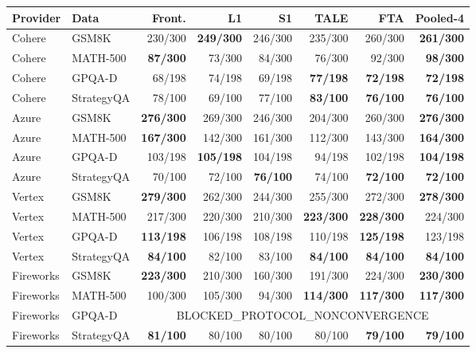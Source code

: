 \begin{tabular}{@{}llrrrrrr@{}}
\toprule
Provider & Data & Front. & L1 & S1 & TALE & FTA & Pooled-4 \\
\midrule
Cohere & GSM8K & 230/300 & \textbf{249/300} & 246/300 & 235/300 & 260/300 & \textbf{261/300} \\
Cohere & MATH-500 & \textbf{87/300} & 73/300 & 84/300 & 76/300 & 92/300 & \textbf{98/300} \\
Cohere & GPQA-D & 68/198 & 74/198 & 69/198 & \textbf{77/198} & \textbf{72/198} & \textbf{72/198} \\
Cohere & StrategyQA & 78/100 & 69/100 & 77/100 & \textbf{83/100} & \textbf{76/100} & \textbf{76/100} \\
Azure & GSM8K & \textbf{276/300} & 269/300 & 246/300 & 204/300 & 260/300 & \textbf{276/300} \\
Azure & MATH-500 & \textbf{167/300} & 142/300 & 161/300 & 112/300 & 143/300 & \textbf{164/300} \\
Azure & GPQA-D & 103/198 & \textbf{105/198} & 104/198 & 94/198 & 102/198 & \textbf{104/198} \\
Azure & StrategyQA & 70/100 & 72/100 & \textbf{76/100} & 74/100 & \textbf{72/100} & \textbf{72/100} \\
Vertex & GSM8K & \textbf{279/300} & 262/300 & 244/300 & 255/300 & 272/300 & \textbf{278/300} \\
Vertex & MATH-500 & 217/300 & 220/300 & 210/300 & \textbf{223/300} & \textbf{228/300} & 224/300 \\
Vertex & GPQA-D & \textbf{113/198} & 106/198 & 108/198 & 110/198 & \textbf{125/198} & 123/198 \\
Vertex & StrategyQA & \textbf{84/100} & 82/100 & 83/100 & \textbf{84/100} & \textbf{84/100} & \textbf{84/100} \\
Fireworks & GSM8K & \textbf{223/300} & 210/300 & 160/300 & 191/300 & 224/300 & \textbf{230/300} \\
Fireworks & MATH-500 & 100/300 & 105/300 & 94/300 & \textbf{114/300} & \textbf{117/300} & \textbf{117/300} \\
Fireworks & GPQA-D & \multicolumn{6}{c}{BLOCKED\_PROTOCOL\_NONCONVERGENCE} \\
Fireworks & StrategyQA & \textbf{81/100} & 80/100 & 80/100 & 80/100 & \textbf{79/100} & \textbf{79/100} \\
\bottomrule
\end{tabular}
